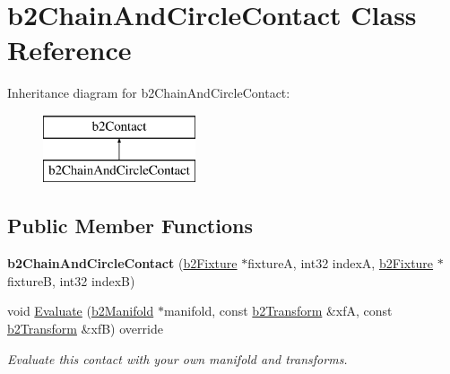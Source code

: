 \hypertarget{classb2_chain_and_circle_contact}{}\section{b2\+Chain\+And\+Circle\+Contact Class Reference}
\label{classb2_chain_and_circle_contact}
Inheritance diagram for b2\+Chain\+And\+Circle\+Contact\+:\begin{figure}[H]
\begin{center}
\leavevmode
\includegraphics[height=2.000000cm]{classb2_chain_and_circle_contact}
\end{center}
\end{figure}
\subsection*{Public Member Functions}
\begin{DoxyCompactItemize}
\item 
\mbox{\label{classb2_chain_and_circle_contact_a7303997b9af2b859346b4fc4d7e107d5}} 
{\bfseries b2\+Chain\+And\+Circle\+Contact} (\hyperlink{classb2_fixture}{b2\+Fixture} $\ast$fixtureA, int32 indexA, \hyperlink{classb2_fixture}{b2\+Fixture} $\ast$fixtureB, int32 indexB)
\item 
\mbox{\label{classb2_chain_and_circle_contact_abdc7f895b76f99f7ddc444ed11986c89}} 
void \hyperlink{classb2_chain_and_circle_contact_abdc7f895b76f99f7ddc444ed11986c89}{Evaluate} (\hyperlink{structb2_manifold}{b2\+Manifold} $\ast$manifold, const \hyperlink{structb2_transform}{b2\+Transform} \&xfA, const \hyperlink{structb2_transform}{b2\+Transform} \&xfB) override
\begin{DoxyCompactList}\small\item\em Evaluate this contact with your own manifold and transforms. \end{DoxyCompactList}\end{DoxyCompactItemize}

